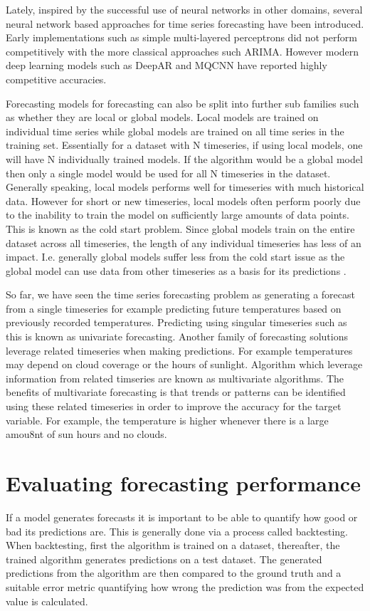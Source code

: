Lately, inspired by the successful use of neural networks in other domains, several neural network based approaches for time series forecasting have been introduced. Early implementations such as simple multi-layered perceptrons did not perform competitively with the more classical approaches such ARIMA. However modern deep learning models such as DeepAR \cite{salinas_deepar_2019} and MQCNN \cite{wen_multi-horizon_2018} have reported highly competitive accuracies.

Forecasting models for forecasting can also be split into further sub families such as whether they are local or global models. Local models are trained on individual time series while global models are trained on all time series in the training set. Essentially for a dataset with N timeseries, if using local models, one will have N individually trained models. If the algorithm would be a global model then only a single model would be used for all N timeseries in the dataset. Generally speaking, local models performs well for timeseries with much historical data. However for short or new timeseries, local models often perform poorly due to the inability to train the model on sufficiently large amounts of data points. This is known as the cold start problem. Since global models train on the entire dataset across all timeseries, the length of any individual timeseries has less of an impact. I.e. generally global models suffer less from the cold start issue as the global model can use data from other timeseries as a basis for its predictions \cite{wang_deep_2019}.

So far, we have seen the time series forecasting problem as generating a forecast from a single timeseries for example predicting future temperatures based on previously recorded temperatures. Predicting using singular timeseries such as this is known as univariate forecasting. Another family of forecasting solutions leverage related timeseries when making predictions. For example temperatures may depend on cloud coverage or the hours of sunlight. Algorithm which leverage information from related timseries are known as multivariate algorithms. The benefits of multivariate forecasting is that trends or patterns can be identified using these related timeseries in order to improve the accuracy for the target variable. For example, the temperature is higher whenever there is a large amou8nt of sun hours and no clouds.

\section{Evaluating forecasting performance}
\label{sec:evaluating_performance}
If a model generates forecasts it is important to be able to quantify how good or bad its predictions are. This is generally done via a process called backtesting. When backtesting, first the algorithm is trained on a dataset, thereafter, the trained algorithm generates predictions on a test dataset. The generated predictions from the algorithm are then compared to the ground truth and a suitable error metric quantifying how wrong the prediction was from the expected value is calculated.

